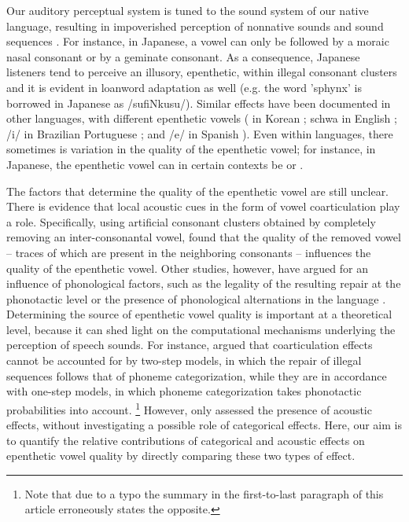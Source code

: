 Our auditory perceptual system is tuned to the sound system of our native language, resulting in impoverished perception of nonnative sounds and sound sequences \cite{sebastian2005}. For instance, in Japanese, a vowel can only be followed by a moraic nasal consonant or by a geminate consonant. As a consequence, Japanese listeners tend to perceive an illusory, epenthetic,  within illegal consonant clusters \cite{dupoux1999, dehaene2000, dupoux2001, monahan2009, dupoux2011, guekozIS17} and it is evident in loanword adaptation as well (e.g. the word 'sphynx' is borrowed in Japanese as /sufiNkusu/). Similar effects have been documented in other languages, with different epenthetic vowels ( in Korean \cite{kabak2007, berent2008, dejong2012}; schwa in English \cite{berent2007, davidson2012}; /i/ in Brazilian Portuguese \cite{dupoux2011, guekozIS17}; and /e/ in Spanish \cite{halle2014}). Even within languages, there sometimes is variation in the quality of the epenthetic vowel; for instance, in Japanese, the epenthetic vowel can in certain contexts be  or  \cite{mattingley2015, guekozIS17}.

The factors that determine the quality of the epenthetic vowel are still unclear. There is evidence that local acoustic cues in the form of vowel coarticulation play a role. Specifically, using artificial consonant clusters obtained by completely removing an inter-consonantal vowel, \cite{dupoux2011} found that the quality of the removed vowel -- traces of which are present in the neighboring consonants -- influences the quality of the epenthetic vowel. Other studies, however, have argued for an influence of phonological factors, such as the legality of the resulting repair at the phonotactic level \cite{mattingley2015} or the presence of phonological alternations in the language \cite{durvasula2015}. Determining the source of epenthetic vowel quality is important at a theoretical level, because it can shed light on the computational mechanisms underlying the perception of speech sounds. For instance, \cite{dupoux2011} argued that coarticulation effects cannot be accounted for by two-step models, in which the repair of illegal sequences follows that of phoneme categorization, while they are in accordance with one-step models, in which phoneme categorization takes phonotactic probabilities into account.
\footnote{Note that due to a typo the summary in the first-to-last paragraph of this article erroneously states the opposite.} 
However, \cite{dupoux2011} only assessed the presence of acoustic effects, without investigating a possible role of categorical effects. Here, our aim is to quantify the relative contributions of categorical and acoustic effects on epenthetic vowel quality by directly comparing these two types of effect. 

